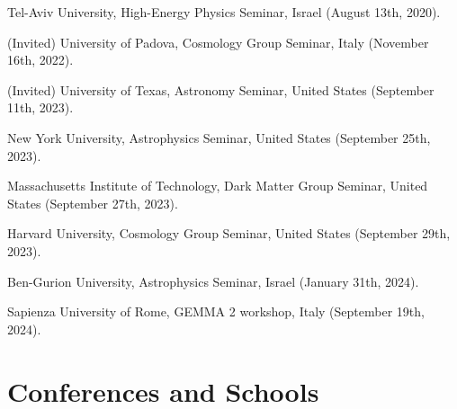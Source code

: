 \documentclass[letterpaper,12pt]{article}
\renewenvironment{itemize}{
  \begin{list}{}{
    \setlength{\leftmargin}{1.5em}
  }
}{
  \end{list}
}
\begin{document}
\begin{itemize}
	\item %
	Tel-Aviv University, High-Energy Physics Seminar, Israel (August 13th, 2020).
	\item (Invited) %
	University of Padova, Cosmology Group Seminar, Italy (November 16th, 2022).
	\item (Invited) %
	University of Texas, Astronomy Seminar, United States (September 11th, 2023).
	\item %
	New York University, Astrophysics Seminar, United States (September 25th, 2023).
	\item %
	Massachusetts Institute of Technology, Dark Matter Group Seminar, United States (September 27th, 2023).
	\item %
	Harvard University, Cosmology Group Seminar, United States (September 29th, 2023).
	\item %
	Ben-Gurion University, Astrophysics Seminar, Israel (January 31th, 2024).
	\item %
	Sapienza University of Rome, GEMMA 2 workshop, Italy (September 19th, 2024).
\end{itemize}

\vspace{-5mm}
\section*{Conferences and Schools}
\end{document}

